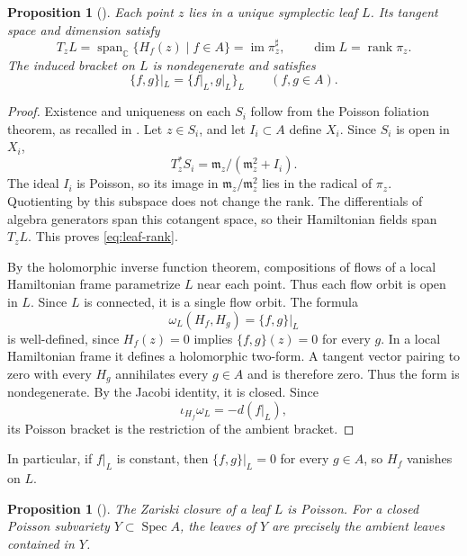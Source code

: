 \documentclass[12pt]{article}
\theoremstyle{paperplain}
\newtheorem{proposition}[theorem]{Proposition}
\theoremstyle{paperdefinition}
\DeclareMathOperator{\Spec}{Spec}
\newcommand{\C}{\mathbb C}
\begin{document}
\begin{proposition}[{\cite[Section~3.5]{BrownGordon}}]\label{prop:leaf-tangent}
    Each point $z$ lies in a unique symplectic leaf $L$. Its tangent space and dimension satisfy
    \begin{equation}\label{eq:leaf-rank}
        T_zL=\operatorname{span}_{\C}\{H_f(z)\mid f\in A\}
        =\operatorname{im}\pi_z^\sharp,\qquad
        \dim L=\operatorname{rank}\pi_z.
    \end{equation}
    The induced bracket on $L$ is nondegenerate and satisfies
    $$
        \{f,g\}|_L=\{f|_L,g|_L\}_L\qquad(f,g\in A).
    $$
\end{proposition}

\begin{proof}
    Existence and uniqueness on each $S_i$ follow from the Poisson foliation theorem, as recalled in \cite[Section~3.5]{BrownGordon}. Let $z\in S_i$, and let $I_i\subset A$ define $X_i$. Since $S_i$ is open in $X_i$,
    $$
        T_z^*S_i=\mathfrak m_z/(\mathfrak m_z^2+I_i).
    $$
    The ideal $I_i$ is Poisson, so its image in $\mathfrak m_z/\mathfrak m_z^2$ lies in the radical of $\pi_z$. Quotienting by this subspace does not change the rank. The differentials of algebra generators span this cotangent space, so their Hamiltonian fields span $T_zL$. This proves \eqref{eq:leaf-rank}.

    By the holomorphic inverse function theorem, compositions of flows of a local Hamiltonian frame parametrize $L$ near each point. Thus each flow orbit is open in $L$. Since $L$ is connected, it is a single flow orbit. The formula
    $$
        \omega_L(H_f,H_g)=\{f,g\}|_L
    $$
    is well-defined, since $H_f(z)=0$ implies $\{f,g\}(z)=0$ for every $g$. In a local Hamiltonian frame it defines a holomorphic two-form. A tangent vector pairing to zero with every $H_g$ annihilates every $g\in A$ and is therefore zero. Thus the form is nondegenerate. By the Jacobi identity, it is closed. Since
    $$
        \iota_{H_f}\omega_L=-d(f|_L),
    $$
    its Poisson bracket is the restriction of the ambient bracket.
\end{proof}

In particular, if $f|_L$ is constant, then $\{f,g\}|_L=0$ for every $g\in A$, so $H_f$ vanishes on $L$.

\begin{proposition}[{\cite[Lemma~3.5 and its proof]{BrownGordon}}]\label{prop:leaf-closure}
    The Zariski closure of a leaf $L$ is Poisson. For a closed Poisson subvariety $Y\subset\Spec A$, the leaves of $Y$ are precisely the ambient leaves contained in $Y$.
\end{proposition}
\end{document}
